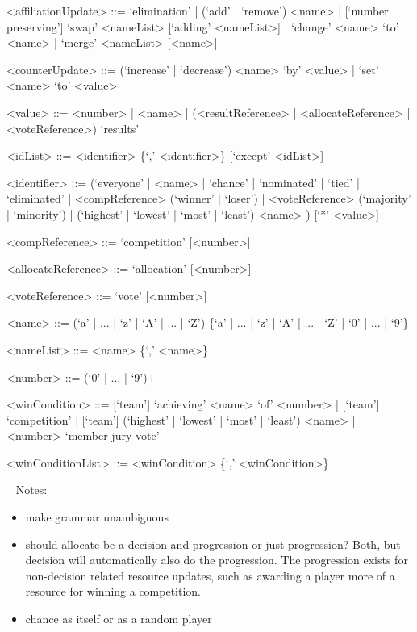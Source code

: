 \documentclass{article}
\begin{document}
\begin{grammar}
<affiliationUpdate> ::= `elimination' | (`add' | `remove') <name> | 
[`number preserving'] `swap' <nameList> [`adding' 
<nameList>] | `change' <name> `to' <name> | `merge' 
<nameList> [<name>]

<counterUpdate> ::= (`increase' | `decrease') <name> `by' <value> | `set' 
<name> `to' <value> 

<value> ::= <number> | <name> | (<resultReference> | <allocateReference> |
<voteReference>) `results'

<idList> ::= <identifier> \{`,' <identifier>\} [`except' <idList>]

<identifier> ::= (`everyone' | <name> | `chance' | `nominated' | `tied' | 
`eliminated' | <compReference> (`winner' | `loser') | <voteReference> 
(`majority' | `minority') | (`highest' | `lowest' | `most' | `least') <name> ) 
[`*' <value>]

<compReference> ::= `competition' [<number>] 

<allocateReference> ::= `allocation' [<number>]

<voteReference> ::= `vote' [<number>]

<name> ::= (`a' | ... | `z' | `A' | ... | `Z') \{`a' | ... | `z' | `A' | ... | 
`Z' | `0' | ... | `9'\}

<nameList> ::= <name> \{`,' <name>\}

<number> ::= (`0' | ... | `9')+

<winCondition> ::= [`team'] `achieving' <name> `of' <number> | [`team'] 
`competition' | [`team'] (`highest' | `lowest' | `most' | `least') <name> | 
<number> `member jury vote'

<winConditionList> ::= <winCondition> \{`,' <winCondition>\}

\end{grammar}

~\newline
Notes:
\begin{itemize}
	\item make grammar unambiguous
	\item should allocate be a decision and progression or just progression? 
	Both, but decision will automatically also do the progression. The 
	progression exists for non-decision related resource updates, such as 
	awarding a player more of a resource for winning a competition.
	\item chance as itself or as a random player
\end{itemize}
\end{document}
